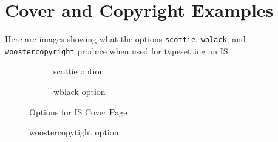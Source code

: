 \chapter{Cover and Copyright Examples}\label{options}
Here are images showing what the options \verb|scottie|, \verb|wblack|, and \verb|woostercopyright| produce when used for typesetting an IS.
\begin{figure}[!ht]
  \centering
    \begin{subfigure}[b]{0.4\textwidth} %
      \centering
      \caption[Grayscale Scottie Mascot]{scottie option}\label{scottie}
    \end{subfigure}
  \qquad
    \begin{subfigure}[b]{0.4\textwidth} %
      \centering
      \caption[Grayscale Wooster 'W]{wblack option}\label{wblack}
    \end{subfigure}
  \caption{Options for IS Cover Page}\label{cover}
\end{figure}
\begin{figure}[!ht]
\begin{center}
\end{center}
\caption{woostercopytight option}\label{copyright}
\end{figure}